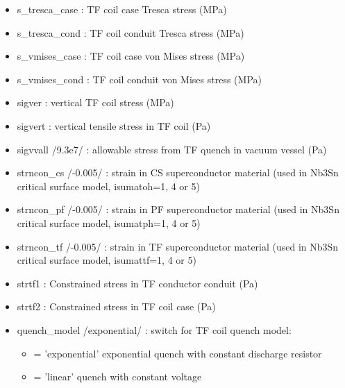 \documentclass[
]{article}
\providecommand{\tightlist}{%
  \setlength{\itemsep}{0pt}\setlength{\parskip}{0pt}}
\begin{document}
\begin{itemize}
\begin{itemize}
  \item
    s\_tresca\_case : TF coil case Tresca stress (MPa)
  \item
    s\_tresca\_cond : TF coil conduit Tresca stress (MPa)
  \item
    s\_vmises\_case : TF coil case von Mises stress (MPa)
  \item
    s\_vmises\_cond : TF coil conduit von Mises stress (MPa)
  \item
    sigver : vertical TF coil stress (MPa)
  \item
    sigvert : vertical tensile stress in TF coil (Pa)
  \item
    sigvvall /9.3e7/ : allowable stress from TF quench in vacuum vessel
    (Pa)
  \item
    strncon\_cs /-0.005/ : strain in CS superconductor material (used in
    Nb3Sn critical surface model, isumatoh=1, 4 or 5)
  \item
    strncon\_pf /-0.005/ : strain in PF superconductor material (used in
    Nb3Sn critical surface model, isumatph=1, 4 or 5)
  \item
    strncon\_tf /-0.005/ : strain in TF superconductor material (used in
    Nb3Sn critical surface model, isumattf=1, 4 or 5)
  \item
    strtf1 : Constrained stress in TF conductor conduit (Pa)
  \item
    strtf2 : Constrained stress in TF coil case (Pa)
  \item
    quench\_model /exponential/ : switch for TF coil quench model:

    \begin{itemize}
    \tightlist
    \item
      = 'exponential' exponential quench with constant discharge
      resistor
    \item
      = 'linear' quench with constant voltage
    \end{itemize}


\end{itemize}
\end{itemize}
\end{document}

